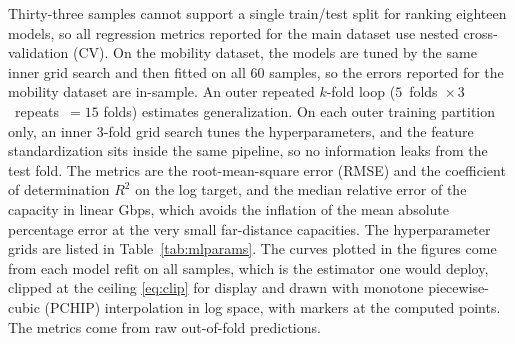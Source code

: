 \documentclass{ieee-ojvt}
\begin{document}
Thirty-three samples cannot support a single train/test split for ranking eighteen
models, so all regression metrics reported for the main dataset use nested
cross-validation (CV). On the mobility dataset, the models are tuned by the same inner
grid search and then fitted on all $60$ samples, so the errors reported for the mobility
dataset are in-sample. An outer repeated $k$-fold loop
($5$~folds~$\times\,3$~repeats~$=15$ folds) estimates generalization. On each outer
training partition only, an inner $3$-fold grid search tunes the hyperparameters, and the
feature standardization sits inside the same pipeline, so no information leaks from the
test fold. The metrics are the root-mean-square error (RMSE) and the coefficient of
determination $R^2$ on the log target, and the median relative error of the capacity in
linear Gbps, which avoids the inflation of the mean absolute percentage error at the very
small far-distance capacities. The hyperparameter grids are listed in
Table~\ref{tab:mlparams}. The curves plotted in the figures come from each model refit on
all samples, which is the estimator one would deploy, clipped at the ceiling
\eqref{eq:clip} for display and drawn with monotone piecewise-cubic (PCHIP)
interpolation in log space, with markers at the computed points. The metrics come from
raw out-of-fold predictions.
\end{document}
